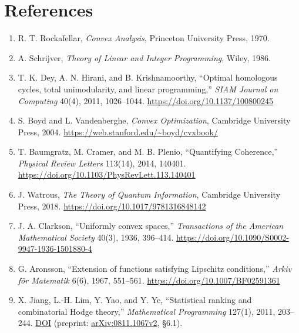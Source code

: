 \documentclass[
]{article}
\providecommand{\tightlist}{%
  \setlength{\itemsep}{0pt}\setlength{\parskip}{0pt}}
\providecommand{\tightlist}{%
  \setlength{\itemsep}{0pt}\setlength{\parskip}{0pt}}
\begin{document}
\section*{References}\label{references}

\begin{enumerate}
\def\labelenumi{\arabic{enumi}.}
\tightlist
\item
  R. T. Rockafellar, \emph{Convex Analysis}, Princeton University Press, 1970.
\item
  A. Schrijver, \emph{Theory of Linear and Integer Programming}, Wiley, 1986.
\item
  T. K. Dey, A. N. Hirani, and B. Krishnamoorthy, ``Optimal homologous cycles,
  total unimodularity, and linear programming,'' \emph{SIAM Journal on Computing}
  40(4), 2011, 1026--1044. \url{https://doi.org/10.1137/100800245}
\item
  S. Boyd and L. Vandenberghe, \emph{Convex Optimization}, Cambridge University
  Press, 2004. \url{https://web.stanford.edu/~boyd/cvxbook/}
\item
  T. Baumgratz, M. Cramer, and M. B. Plenio, ``Quantifying Coherence,'' \emph{Physical
  Review Letters} 113(14), 2014, 140401. \url{https://doi.org/10.1103/PhysRevLett.113.140401}
\item
  J. Watrous, \emph{The Theory of Quantum Information}, Cambridge University Press, 2018. \url{https://doi.org/10.1017/9781316848142}
\item
  J. A. Clarkson, ``Uniformly convex spaces,'' \emph{Transactions of the American
  Mathematical Society} 40(3), 1936, 396--414. \url{https://doi.org/10.1090/S0002-9947-1936-1501880-4}
\item
  G. Aronsson, ``Extension of functions satisfying Lipschitz conditions,''
  \emph{Arkiv för Matematik} 6(6), 1967, 551--561. \url{https://doi.org/10.1007/BF02591361}
\item
  X. Jiang, L.-H. Lim, Y. Yao, and Y. Ye, ``Statistical ranking and combinatorial Hodge theory,'' \emph{Mathematical Programming} 127(1), 2011, 203--244. \href{https://doi.org/10.1007/s10107-010-0419-x}{DOI} (preprint: \href{https://arxiv.org/abs/0811.1067v2}{arXiv:0811.1067v2}, §6.1).
\end{enumerate}
\end{document}

